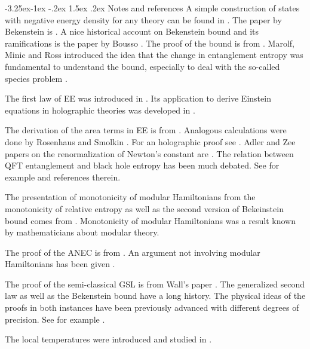 \documentclass[11pt]{article}
\makeatletter
\renewcommand\subsection{\@startsection{subsection}{2}{\z@}%
                                   {-3.25ex\@plus -1ex \@minus -.2ex}%
                                     {1.5ex \@plus .2ex}%
                                     {\normalfont\bfseries}}
\numberwithin{equation}{section}
\makeatother
\begin{document}
\subsection{Notes and references}
A simple construction of states with negative energy density for any theory can be found in \cite{Witten:2018lha}.  The paper by Bekenstein is \cite{bekenstein1981universal}. A nice historical account on Bekenstein bound and its ramifications is the paper by Bousso \cite{Bousso:2018bli}.
 The proof of the bound is from \cite{Casini:2008cr}. Marolf, Minic and Ross introduced the idea that the change in entanglement entropy was fundamental to understand the bound, especially to deal with the so-called species problem \cite{Marolf:2003sq}. 
 
The first law of EE was introduced in \cite{Blanco:2013joa,Wong:2013gua}. Its application to derive Einstein equations in holographic theories was developed in \cite{Lashkari:2013koa,Faulkner:2013ica}.   

The derivation of the area terms in EE is from \cite{Casini:2014yca}. Analogous calculations were done by Rosenhaus and Smolkin  \cite{Rosenhaus:2014ula}. For an holographic proof see \cite{Casini:2015ffa}. Adler and Zee papers on the renormalization of Newton's constant are \cite{Adler:1982ri,Zee:1980sj}. The relation between QFT entanglement and black hole entropy has been much debated. See for example \cite{Cooperman:2013iqr} and references therein. 

The presentation of monotonicity of modular Hamiltonians from the monotonicity of relative entropy as well as the second version of Bekeinstein bound comes from \cite{Blanco:2013lea}. Monotonicity of modular Hamiltonians was a result known by mathematicians about modular theory.     

The proof of the ANEC is from \cite{Faulkner:2016mzt}. An argument not involving modular Hamiltonians has been given \cite{Hartman:2016lgu}.  
 
The proof of the semi-classical GSL is from Wall's paper \cite{Wall:2011hj}. The generalized second law as well as the Bekenstein bound have a long history. The physical ideas of the proofs in both instances have been previously advanced with different degrees of precision. See for example \cite{Marolf:2003wu,Marolf:2003sq,sorkin1986toward,Sorkin:1997ja,Frolov:1993fy,zurek1985statistical}.

The local temperatures were introduced and studied in \cite{Arias:2016nip,Arias:2017dda}. 
\end{document}
